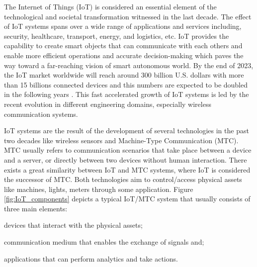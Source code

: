 \documentclass[conference]{IEEEtran}
\begin{document}








The Internet of Things (IoT) is considered an essential element of the technological and societal transformation witnessed in the last decade. The effect of IoT systems spans over a wide range of applications and services including, security, healthcare, transport, energy, and logistics, etc. IoT provides the capability to create smart objects that can communicate with each others and enable more efficient operations and accurate decision-making which paves the way toward a far-reaching vision of smart autonomous world. By the end of 2023, the IoT market worldwide will reach around 300 billion U.S. dollars with more than 15 billions connected devices and this numbers are expected to be doubled in the following years \cite{transforma_insights_current_nodate}. This fast accelerated growth of IoT systems is led by the recent evolution in different  engineering domains, especially wireless communication systems.

IoT systems are the result of the development of several technologies in the past two decades like wireless sensors and Machine-Type Communication (MTC). MTC usually refers to communication scenarios that take place between a  device and a server, or directly between two devices without human interaction. There exists a great similarity between IoT and MTC systems, where IoT is considered the successor of MTC. Both technologies aim to control/access physical assets like machines, lights, meters through some application. Figure \ref{fig:IoT_components} \cite{herrero_fundamentals_2021} depicts a typical IoT/MTC system that usually consists of three main elements: \begin{enumerate*}
    \item   devices that interact with the physical assets;
    \item   communication medium that enables the exchange of signals and;
    \item   applications that can perform analytics and take actions.
\end{enumerate*}
\end{document}
